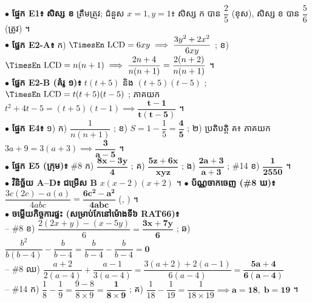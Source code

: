 \documentclass[a4paper,10pt]{article}
\newcommand{\en}[1]{{\TimesEn #1}}
\newcommand{\cnum}[1]{\mbox{\fontsize{10pt}{12pt}\selectfont\ding{\numexpr181+#1\relax}}}
\begin{document}
\begin{tcolorbox}[
  enhanced, sharp corners, colback=white, colframe=black,
  boxrule=0.85pt, boxsep=3pt, top=5pt, bottom=5pt, left=6pt, right=6pt
]
  $\bullet$ \textbf{ផ្នែក \en{E1}៖} \textbf{សិស្ស ខ} ត្រឹមត្រូវ; ជំនួស $x = 1, y = 1$៖ សិស្ស ក បាន $\dfrac{2}{5}$ (ខុស), សិស្ស ខ បាន $\dfrac{5}{6}$ (ត្រូវ) ។\\[3pt]
  $\bullet$ \textbf{ផ្នែក \en{E2-A}៖} ក) $\text{\en{LCD}} = 6xy \implies \dfrac{3y^2 + 2x^2}{6xy}$ \quad ; \quad ខ) $\text{\en{LCD}} = n(n+1) \implies \dfrac{2n + 4}{n(n+1)} = \dfrac{2(n + 2)}{n(n + 1)}$ ។\\[3pt]
  $\bullet$ \textbf{ផ្នែក \en{E2-B} (គំរូ ១)៖} $t(t+5)$ និង $(t+5)(t-5)$ ; $\text{\en{LCD}} = t(t+5)(t-5)$ ; ភាគយក $t^2 + 4t - 5 = (t+5)(t-1) \implies \mathbf{\dfrac{t - 1}{t(t - 5)}}$ ។\\[3pt]
  $\bullet$ \textbf{ផ្នែក \en{E4}៖} ១) ក) $\dfrac{1}{n(n+1)}$ ; ខ) $S = 1 - \dfrac{1}{5} = \mathbf{\dfrac{4}{5}}$ \quad ; \quad ២) ប្រតិបត្តិ គ៖ ភាគយក $3a + 9 = 3(a+3) \implies \mathbf{\dfrac{3}{a - 5}}$ ។\\[3pt]
  $\bullet$ \textbf{ផ្នែក \en{E5} (ក្រុម)៖} \en{\#8} ក) $\mathbf{\dfrac{8x - 3y}{4}}$ ; គ) $\mathbf{\dfrac{5z + 6x}{xyz}}$ ; ង) $\mathbf{\dfrac{2a + 3}{a + 3}}$ ; \en{\#14} ខ) $\mathbf{\dfrac{1}{2550}}$ ។\\[3pt]
  $\bullet$ \textbf{វិនិច្ឆ័យ \en{A--D}៖} \textbf{ជម្រើស \en{B}} $x(x - 2)(x + 2)$ ។ \quad $\bullet$ \textbf{ប័ណ្ណចាកចេញ (\en{\#8} ឃ)៖} $\dfrac{3c(2c) - a(a)}{4abc} = \mathbf{\dfrac{6c^2 - a^2}{4abc}}$ (\cnum{2}, \cnum{3}) ។\\[3pt]
  $\bullet$ \textbf{ចម្លើយកិច្ចការផ្ទះ (សម្រាប់កែនៅម៉ោងទី៦ \en{RAT66})៖}\\[2pt]
  \hspace*{0.4em}– \en{\#8} ខ) $\dfrac{2(2x+y) - (x-5y)}{6} = \mathbf{\dfrac{3x + 7y}{6}}$ \quad ; \quad \en{\#8} ឆ) $\dfrac{b^2}{b(b-4)} - \dfrac{b}{b-4} = \dfrac{b}{b-4} - \dfrac{b}{b-4} = \mathbf{0}$\\[2pt]
  \hspace*{0.4em}– \en{\#8} ឈ) $\dfrac{a+2}{2(a-4)} + \dfrac{a-1}{3(a-4)} = \dfrac{3(a+2) + 2(a-1)}{6(a-4)} = \mathbf{\dfrac{5a + 4}{6(a - 4)}}$\\[2pt]
  \hspace*{0.4em}– \en{\#14} ក) $\dfrac{1}{8} - \dfrac{1}{9} = \dfrac{9 - 8}{8 \times 9} = \mathbf{\dfrac{1}{8 \times 9}}$ \quad ; \quad \en{\#14} គ) $\dfrac{1}{18} - \dfrac{1}{19} = \dfrac{1}{18 \times 19} \implies \mathbf{a = 18,\; b = 19}$ ។
\end{tcolorbox}
\end{document}

